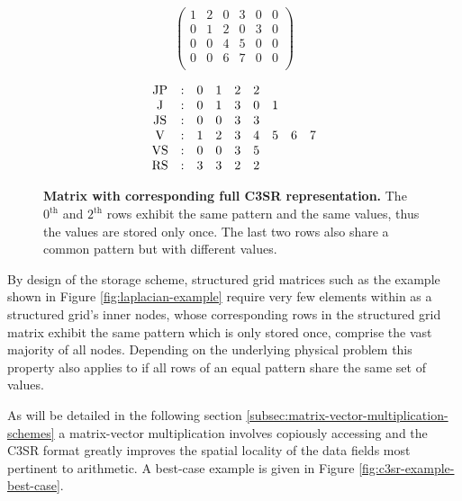 \documentclass{article}
\begin{document}
    \begin{figure}[ht]
      \centering
      \begin{minipage}{0.4\textwidth}
        \centering
        $$
        \begin{pmatrix}
          1 & 2 & 0 & 3 & 0 & 0 \\
          0 & 1 & 2 & 0 & 3 & 0 \\
          0 & 0 & 4 & 5 & 0 & 0 \\
          0 & 0 & 6 & 7 & 0 & 0 \\
        \end{pmatrix}
        $$
      \end{minipage}
      \begin{minipage}{0.4\textwidth}
        \centering
        $$
        \begin{matrix}
          \JP & : & 0 & 1 & 2 & 2 &   &   &   \\
           \J & : & 0 & 1 & 3 & 0 & 1 &   &   \\
          \JS & : & 0 & 0 & 3 & 3 &   &   &   \\
           \V & : & 1 & 2 & 3 & 4 & 5 & 6 & 7 \\
          \VS & : & 0 & 0 & 3 & 5 &   &   &   \\
          \RS & : & 3 & 3 & 2 & 2 &   &   &   \\
        \end{matrix}
        $$
      \end{minipage}
      \caption[Matrix with corresponding full C3SR representation.]{\textbf{Matrix with corresponding full C3SR representation.} The $0^{\text{th}}$ and $2^{\text{th}}$ rows exhibit the same pattern and the same values, thus the values are stored only once. The last two rows also share a common pattern but with different values.}
      \label{fig:c3sr_example_full}
    \end{figure}

    By design of the storage scheme, structured grid matrices such as the example shown in Figure \ref{fig:laplacian-example} require very few elements within \J as a structured grid's inner nodes, whose corresponding rows in the structured grid matrix exhibit the same pattern which is only stored once, comprise the vast majority of all nodes. Depending on the underlying physical problem this property also applies to \V if all rows of an equal pattern share the same set of values. 

    As will be detailed in the following section \ref{subsec:matrix-vector-multiplication-schemes} a matrix-vector multiplication involves copiously accessing \J and \V the C3SR format greatly improves the spatial locality of the data fields most pertinent to arithmetic. A best-case example is given in Figure \ref{fig:c3sr-example-best-case}.
\end{document}
